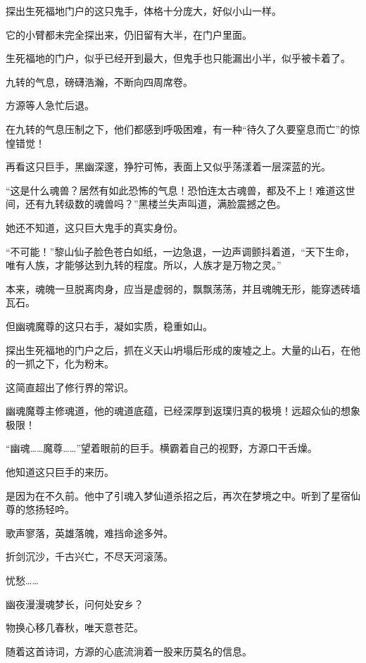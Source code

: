 
\begin{this_body}



探出生死福地门户的这只鬼手，体格十分庞大，好似小山一样。

它的小臂都未完全探出来，仍旧留有大半，在门户里面。

生死福地的门户，似乎已经开到最大，但鬼手也只能漏出小半，似乎被卡着了。

九转的气息，磅礴浩瀚，不断向四周席卷。

方源等人急忙后退。

在九转的气息压制之下，他们都感到呼吸困难，有一种“待久了久要窒息而亡”的惊惶错觉！

再看这只巨手，黑幽深邃，狰狞可怖，表面上又似乎荡漾着一层深蓝的光。

“这是什么魂兽？居然有如此恐怖的气息！恐怕连太古魂兽，都及不上！难道这世间，还有九转级数的魂兽吗？”黑楼兰失声叫道，满脸震撼之色。

她还不知道，这只巨大鬼手的真实身份。

“不可能！”黎山仙子脸色苍白如纸，一边急退，一边声调颤抖着道，“天下生命，唯有人族，才能够达到九转的程度。所以，人族才是万物之灵。”

本来，魂魄一旦脱离肉身，应当是虚弱的，飘飘荡荡，并且魂魄无形，能穿透砖墙瓦石。

但幽魂魔尊的这只右手，凝如实质，稳重如山。

探出生死福地的门户之后，抓在义天山坍塌后形成的废墟之上。大量的山石，在他的一抓之下，化为粉末。

这简直超出了修行界的常识。

幽魂魔尊主修魂道，他的魂道底蕴，已经深厚到返璞归真的极境！远超众仙的想象极限！

“幽魂……魔尊……”望着眼前的巨手。横霸着自己的视野，方源口干舌燥。

他知道这只巨手的来历。

是因为在不久前。他中了引魂入梦仙道杀招之后，再次在梦境之中。听到了星宿仙尊的悠扬轻吟。

歌声寥落，英雄落魄，难挡命途多舛。

折剑沉沙，千古兴亡，不尽天河滚荡。

忧愁……

幽夜漫漫魂梦长，问何处安乡？

物换心移几春秋，唯天意苍茫。

随着这首诗词，方源的心底流淌着一股来历莫名的信息。


\end{this_body}
